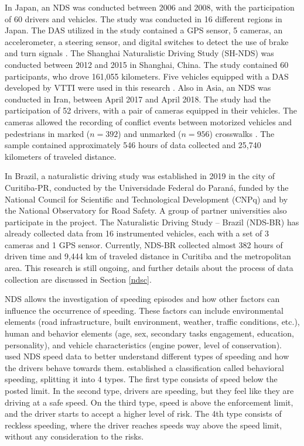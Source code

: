 In Japan, an NDS was conducted between 2006 and 2008, with the participation of 60 drivers and vehicles. The study was conducted in 16 different regions in Japan. The DAS utilized in the study contained a GPS sensor, 5 cameras, an accelerometer, a steering sensor, and digital switches to detect the use of brake and turn signals \cite{Uchida2010}. The Shanghai Naturalistic Driving Study (SH-NDS) was conducted between 2012 and 2015 in Shanghai, China. The study contained 60 participants, who drove 161,055 kilometers. Five vehicles equipped with a DAS developed by VTTI were used in this research \cite{Zhu2018}. Also in Asia, an NDS was conducted in Iran, between April 2017 and April 2018. The study had the participation of 52 drivers, with a pair of cameras equipped in their vehicles. The cameras allowed the recording of conflict events between motorized vehicles and pedestrians in marked ($n = 392$) and unmarked ($n = 956$) crosswalks \cite{Sheykhfard2021}. The sample contained approximately 546 hours of data collected and 25,740 kilometers of traveled distance.

In Brazil, a naturalistic driving study was established in 2019 in the city of Curitiba-PR, conducted by the Universidade Federal do Paraná, funded by the National Council for Scientific and Technological Development (CNPq) and by the National Observatory for Road Safety. A group of partner universities also participate in the project. The Naturalistic Driving Study – Brazil (NDS-BR) has already collected data from 16 instrumented vehicles, each with a set of 3 cameras and 1 GPS sensor. Currently, NDS-BR collected almost 382 hours of driven time and 9,444 km of traveled distance in Curitiba and the metropolitan area. This research is still ongoing, and further details about the process of data collection are discussed in Section \ref{ndsc}.

NDS allows the investigation of speeding episodes and how other factors can influence the occurrence of speeding. These factors can include environmental elements (road infrastructure, built environment, weather, traffic conditions, etc.), human and behavior elements (age, sex, secondary tasks engagement, education, personality),  and vehicle characteristics (engine power, level of conservation). \textcite{Richard2013,Richard2017, Richard2020} used NDS speed data to better understand different types of speeding and how the drivers behave towards them. \textcite{Richard2013} established a classification called behavioral speeding, splitting it into 4 types. The first type consists of speed below the posted limit. In the second type, drivers are speeding, but they feel like they are driving at a safe speed. On the third type, speed is above the enforcement limit, and the driver starts to accept a higher level of risk. The 4th type consists of reckless speeding, where the driver reaches speeds way above the speed limit, without any consideration to the risks. 

